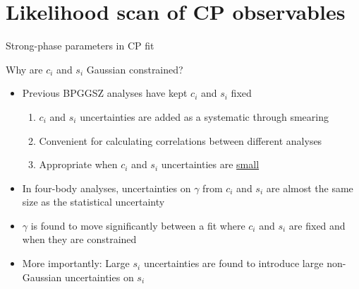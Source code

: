 \documentclass[xcolor={dvipsnames}]{beamer}
\begin{document}
\section{Likelihood scan of CP observables}
\begin{frame}{Strong-phase parameters in CP fit}
  \begin{center}
    {\large Why are $c_i$ and $s_i$ Gaussian constrained?}
  \end{center}
  \begin{itemize}
    \setlength\itemsep{1.0em}
    \item{Previous BPGGSZ analyses have kept $c_i$ and $s_i$ fixed}
    \begin{enumerate}
      \item{$c_i$ and $s_i$ uncertainties are added as a systematic through smearing}
      \item{Convenient for calculating correlations between different analyses}
      \item{Appropriate when $c_i$ and $s_i$ uncertainties are \underline{small}}
    \end{enumerate}
    \item{In four-body analyses, uncertainties on $\gamma$ from $c_i$ and $s_i$ are almost the same size as the statistical uncertainty}
    \item{$\gamma$ is found to move significantly between a fit where $c_i$ and $s_i$ are fixed and when they are constrained}
    \item{More importantly: Large $s_i$ uncertainties are found to introduce large non-Gaussian uncertainties on $s_i$}
  \end{itemize}
\end{frame}
\end{document}
